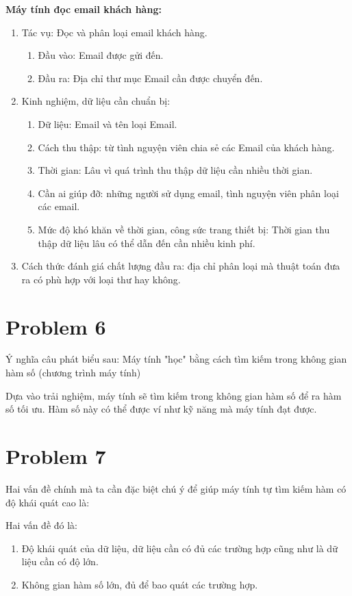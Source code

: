 \documentclass[12pt,letterpaper]{article}
\begin{document}
\textbf{Máy tính đọc email khách hàng:}
\begin{enumerate}
    \item Tác vụ: Đọc và phân loại email khách hàng.
    \begin{enumerate}
        \item Đầu vào: Email được gửi đến.
        \item Đầu ra: Địa chỉ thư mục Email cần được chuyển đến.
    \end{enumerate}
    \item Kinh nghiệm, dữ liệu cần chuẩn bị:
    \begin{enumerate}
        \item Dữ liệu: Email và tên loại Email.
        \item Cách thu thập: từ tình nguyện viên chia sẻ các Email của khách hàng.
        \item Thời gian: Lâu vì quá trình thu thập dữ liệu cần nhiều thời gian.
        \item Cần ai giúp đỡ: những người sử dụng email, tình nguyện viên phân loại các email.
        \item Mức độ khó khăn về thời gian, công sức trang thiết bị: Thời gian thu thập dữ liệu lâu có thể dẫn đến cần nhiều kinh phí.
    \end{enumerate}
    \item Cách thức đánh giá chất lượng đầu ra: địa chỉ phân loại mà thuật toán đưa ra có phù hợp với loại thư hay không. 
\end{enumerate}

\section* {Problem 6}
Ý nghĩa câu phát biểu sau: Máy tính "học" bằng cách tìm kiếm trong không gian hàm số (chương trình máy tính)

Dựa vào trải nghiệm, máy tính sẽ tìm kiếm trong không gian hàm số để ra hàm số tối ưu. Hàm số này có thể được ví như kỹ năng mà máy tính đạt được.
\section* {Problem 7}
Hai vấn đề chính mà ta cần đặc biệt chú ý để giúp máy tính tự tìm kiếm hàm có độ khái quát cao là:

Hai vấn đề đó là:
\begin{enumerate}
    \item Độ khái quát của dữ liệu, dữ liệu cần có đủ các trường hợp cũng như là dữ liệu cần có độ lớn.
    \item Không gian hàm số lớn, đủ để bao quát các trường hợp.
\end{enumerate}
\end{document}
